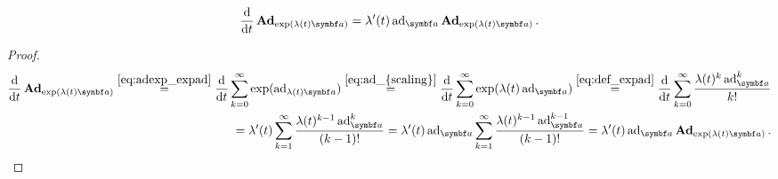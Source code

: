 \begin{lemma}
  \label{lem:d_bad_exp}
  \begin{equation}
    \frac{\mathrm{d}}{\mathrm{d}t} \bAd_{\exp(\lambda(t) \a)} = \lambda'(t) \ad_{\a} \bAd_{\exp(\lambda(t) \a)}.
  \end{equation}
\end{lemma}
\begin{proof}
  \begin{equation}
    \begin{aligned}
      \frac{\mathrm{d}}{\mathrm{d}t} \bAd_{\exp(\lambda(t) \a)}
      \overset{\eqref{eq:adexp_expad}}= \frac{\mathrm{d}}{\mathrm{d}t} \sum_{k = 0}^\infty \exp(\ad_{\lambda(t) \a})
      \overset{\eqref{eq:ad_{scaling}}}= \frac{\mathrm{d}}{\mathrm{d}t} \sum_{k = 0}^\infty \exp(\lambda(t) \ad_{\a})
      \overset{\eqref{eq:def_expad}}= \frac{\mathrm{d}}{\mathrm{d}t} \sum_{k=0}^{\infty} \frac{\lambda(t)^{k} \ad_{\a}^{k}}{k!} \\
      = \lambda'(t) \sum_{k=1}^{\infty} \frac{\lambda(t)^{k-1} \ad_{\a}^{k}}{(k-1)!} = \lambda'(t) \ad_{\a} \sum_{k=1}^{\infty} \frac{\lambda(t)^{k-1} \ad_{\a}^{k-1}}{(k-1)!} = \lambda'(t) \ad_{\a} \bAd_{\exp(\lambda(t) \a)}.
    \end{aligned}
  \end{equation}
\end{proof}


